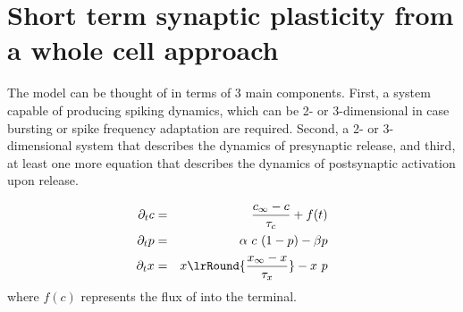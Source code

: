 \section{Short term synaptic plasticity from a whole cell approach}

The model can be thought of in terms of 3 main components. First, a system capable of producing spiking dynamics, which can be 2- or 3-dimensional in case bursting or spike frequency adaptation are required. Second, a 2- or 3-dimensional system that describes the dynamics of presynaptic release, and third, at least one more equation that describes the dynamics of postsynaptic activation upon release. 

\begin{eqnarray}
\partial_{t} c &=& \frac{c_{\infty}-c}{\tau_{c}} + f(t)
\\
\partial_{t} p &=&  \alpha ~c~(1-p) - \beta p  
\\
\partial_{t} x &=& x\lrRound{\frac{x_{\infty}-x}{\tau_{x}}} - 
x~p
\end{eqnarray}
where $f(c)$ represents the flux of \calcium into the terminal. 

                

